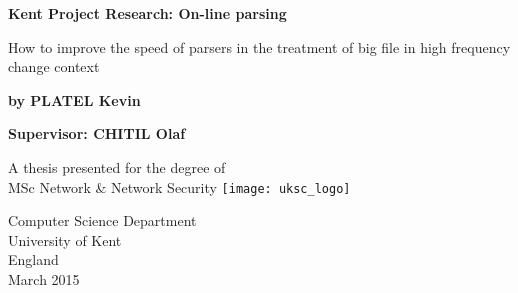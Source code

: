 \begin{titlepage}
    \begin{center}
        \vspace*{1cm}
        
        \textbf{Kent Project Research: On-line parsing}
        
        \vspace{0.5cm}
        How to improve the speed of parsers in the treatment of big file in high frequency change context
        \vspace{1.5cm}
        
        \textbf{by PLATEL Kevin}
        
        \textbf{Supervisor: CHITIL Olaf}
        
        \vspace{1cm}
        
        A thesis presented for the degree of\\
        MSc Network \& Network Security
        \texttt{[image: uksc\_logo]}
        \vfill
        
        Computer Science Department\\
        University of Kent\\
        England\\
        March 2015
        
    \end{center}
\end{titlepage}